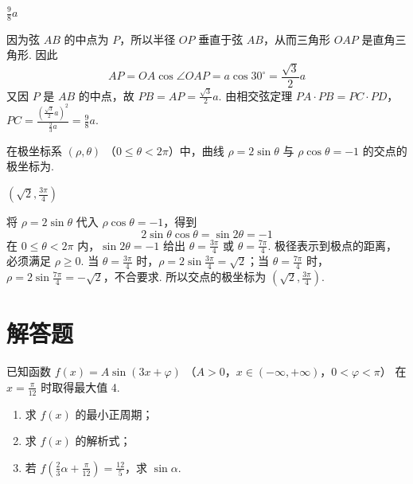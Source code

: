 \begin{answer}
\(\frac{9}{8}a\)
\end{answer}

\begin{solution}
因为弦 \(AB\) 的中点为 \(P\)，所以半径 \(OP\) 垂直于弦 \(AB\)，从而三角形 \(OAP\) 是直角三角形. 因此
\[
AP=OA\cos\angle OAP=a\cos30^\circ=\frac{\sqrt3}{2}a
\]
又因 \(P\) 是 \(AB\) 的中点，故 \(PB=AP=\frac{\sqrt3}{2}a\). 由相交弦定理
\(PA\cdot PB=PC\cdot PD\)，\(PC=\frac{(\frac{\sqrt3}{2}a)^2}{\frac23a}=\frac98a\).
\end{solution}

\begin{problem}
在极坐标系 \((\rho, \theta)\) （\(0 \leqslant \theta < 2\pi\)）中，曲线 \(\rho = 2\sin \theta\) 与 \(\rho \cos \theta = -1\) 的交点的极坐标为\fillinblank{}.
\end{problem}

\begin{answer}
\(\left(\sqrt{2},\frac{3\pi}{4}\right)\)
\end{answer}

\begin{solution}
将 \(\rho=2\sin\theta\) 代入 \(\rho\cos\theta=-1\)，得到
\[
2\sin\theta\cos\theta=\sin2\theta=-1
\]
在 \(0\leqslant\theta<2\pi\) 内，\(\sin2\theta=-1\) 给出 \(\theta=\frac{3\pi}{4}\) 或 \(\theta=\frac{7\pi}{4}\). 极径表示到极点的距离，必须满足 \(\rho\geqslant0\). 当 \(\theta=\frac{3\pi}{4}\) 时，\(\rho=2\sin\frac{3\pi}{4}=\sqrt2\)；当 \(\theta=\frac{7\pi}{4}\) 时，\(\rho=2\sin\frac{7\pi}{4}=-\sqrt2\)，不合要求. 所以交点的极坐标为 \(\left(\sqrt2,\frac{3\pi}{4}\right)\).
\end{solution}

\section{解答题}

\begin{problem}
已知函数 \( f(x) = A \sin (3x + \varphi) \) （\(A > 0\)，\(x \in (-\infty, +\infty)\)，\(0 < \varphi < \pi\)） 在 \( x = \frac{\pi}{12} \) 时取得最大值 4.

\begin{enumerate}
\item 求 \( f(x) \) 的最小正周期；
\item 求 \( f(x) \) 的解析式；
\item 若 \( f\left(\frac{2}{3}\alpha + \frac{\pi}{12}\right) = \frac{12}{5} \)，求 \( \sin \alpha \).
\end{enumerate}
\end{problem}

